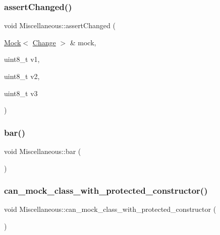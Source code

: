 \subsubsection{\texorpdfstring{assertChanged()}{assertChanged()}}
{\footnotesize\ttfamily void Miscellaneous\+::assert\+Changed (\begin{DoxyParamCaption}\item[{\mbox{\hyperlink{classfakeit_1_1Mock}{Mock}}$<$ \mbox{\hyperlink{structMiscellaneous_1_1Change}{Change}} $>$ \&}]{mock,  }\item[{uint8\+\_\+t}]{v1,  }\item[{uint8\+\_\+t}]{v2,  }\item[{uint8\+\_\+t}]{v3 }\end{DoxyParamCaption})\hspace{0.3cm}{\ttfamily [inline]}}

\mbox{\label{structMiscellaneous_a565c59e4e7a64ea2135e31db72251a21}} 
\subsubsection{\texorpdfstring{bar()}{bar()}}
{\footnotesize\ttfamily void Miscellaneous\+::bar (\begin{DoxyParamCaption}{ }\end{DoxyParamCaption})\hspace{0.3cm}{\ttfamily [inline]}}

\mbox{\label{structMiscellaneous_ae46a0388ab5f287be832e6ef071bed9b}} 
\subsubsection{\texorpdfstring{can\_mock\_class\_with\_protected\_constructor()}{can\_mock\_class\_with\_protected\_constructor()}}
{\footnotesize\ttfamily void Miscellaneous\+::can\+\_\+mock\+\_\+class\+\_\+with\+\_\+protected\+\_\+constructor (\begin{DoxyParamCaption}{ }\end{DoxyParamCaption})\hspace{0.3cm}{\ttfamily [inline]}}

